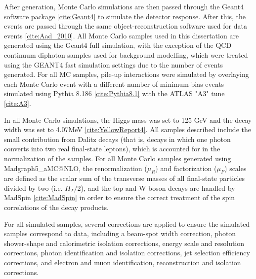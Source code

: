 After generation, Monte Carlo simulations are then passed through the Geant4 software package \ref{cite:Geant4} to simulate the detector response. After this, the events are passed through the same object-reconstruction software used for data events \ref{cite:Aad_2010}. All Monte Carlo samples used in this dissertation are generated using the Geant4 full simulation, with the exception of the QCD continuum diphoton samples used for background modelling, which were treated using the GEANT4 fast simulation settings due to the number of events generated. For all MC samples, pile-up interactions were simulated by overlaying each Monte Carlo event with a different number of minimum-bias events simulated using Pythia 8.186 \ref{cite:Pythia8.1} with the ATLAS "A3" tune \ref{cite:A3}.

In all Monte Carlo simulations, the Higgs mass was set to 125 GeV and the decay width was set to 4.07MeV \ref{cite:YellowReport4}. All samples described include the small contribution from Dalitz decays (that is, decays in which one photon converts into two real final-state leptons), which is accounted for in the normalization of the samples. For all Monte Carlo samples generated using Madgraph5\_aMC@NLO, the renormalization ($\mu_{R}$) and factorization ($\mu_{F}$) scales are defined as the scalar sum of the transverse masses of all final-state particles divided by two (i.e. $H_{T}/2$), and the top and W boson decays are handled by MadSpin \ref{cite:MadSpin} in order to ensure the correct treatment of the spin correlations of the decay products.

For all simulated samples, several corrections are applied to ensure the simulated samples correspond to data, including a beam-spot width correction, photon shower-shape and calorimetric isolation corrections, energy scale and resolution corrections, photon identification and isolation corrections, jet selection efficiency corrections, and electron and muon identification, reconstruction and isolation corrections.


